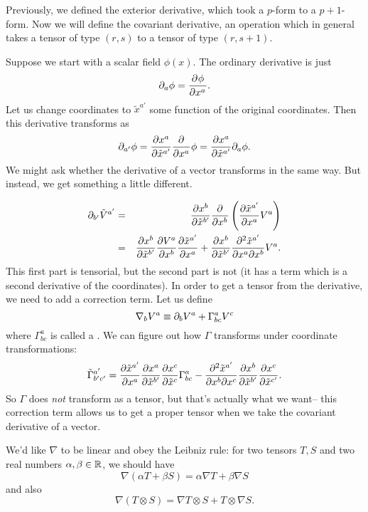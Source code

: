 Previously, we defined the exterior derivative, which took a $p$-form to a $p+1$-form. Now we will define the covariant derivative, an operation which in general takes a tensor of type $(r,s)$ to a tensor of type $(r,s+1)$.

Suppose we start with a scalar field $\phi(x)$. The ordinary derivative is just
$$\partial_a \phi=\frac{\partial^{} {\phi}}{\partial {{x^a}} ^{}}.$$
Let us change coordinates to ${\tilde x^{a'}}$ some function of the original coordinates. Then this derivative transforms as
$$\partial_{a'}\phi= \frac{\partial x^a}{\partial {\tilde x}^{a'}} \frac{\partial^{} {}}{\partial {x^a} ^{}}\phi = \frac{\partial x^a}{\partial {\tilde x}^{a'}}\partial_a \phi.$$
We might ask whether the derivative of a vector transforms in the same way. But instead, we get something a little different.

\begin{eqnarray*}
\partial_{b'} \tilde V^{a'} &=& \frac{\partial x^b}{\partial \tilde x^{b'}} \frac{\partial^{} {}}{\partial {x^b} ^{}}\left( \frac{ \partial \tilde x^{a'}}{\partial x^a} V^a\right)\\
&=&\frac{\partial x^b}{\partial \tilde x^{b'}}\frac{\partial V^a}{\partial x^b} \frac{\partial \tilde x^{a'}}{\partial x^a} + \frac{\partial x^b}{\partial \tilde x^{b'}}\frac{\partial^2 \tilde x^{a'}}{\partial x^a \partial x^b}V^a.
\end{eqnarray*}
This first part is tensorial, but the second part is not (it has a term which is a second derivative of the coordinates). In order to get a tensor from the derivative, we need to add a correction term. Let us define
$$\nabla_b V^a \equiv \partial_b V^a +\Gamma^a_{bc} V^c$$
where $\Gamma^a_{bc}$ is called a . We can figure out how $\Gamma$ transforms under coordinate transformations:
$$\tilde \Gamma^{a'}_{b'c'}=\frac{\partial \tilde x^{a'}}{\partial x^a} \frac{ \partial x^a}{\partial \tilde x^{b'}}\frac{\partial x^c}{\partial \tilde x^c} \Gamma^a_{bc}-\frac{\partial^2 \tilde x^{a'}}{\partial x^b \partial x^c}\frac{\partial x^b}{\partial \tilde x^{b'}}\frac{\partial x^c}{\partial\tilde x^{c'}}.$$
So $\Gamma$ does \emph{not} transform as a tensor, but that's actually what we want-- this correction term allows us to get a proper tensor when we take the covariant derivative of a vector.

We'd like $\nabla$ to be linear and obey the Leibniz rule: for two tensors $T,S$ and two real numbers $\alpha,\beta\in \mathbb{R}$, we should have
$$\nabla(\alpha T+\beta S)= \alpha \nabla T+\beta \nabla S$$
and also
$$\nabla(T\otimes S)=\nabla T \otimes S + T\otimes \nabla S.$$

